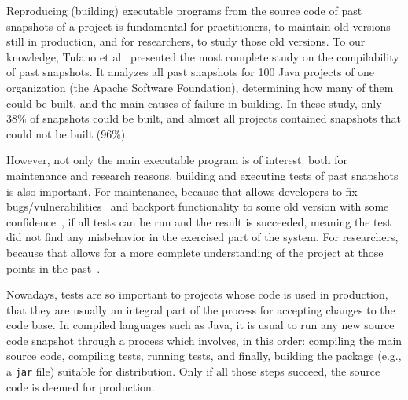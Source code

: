 
Reproducing (building) executable programs from the source code of past snapshots
 of a project is fundamental for practitioners, to maintain old versions still in production, and for researchers, to study those old versions. 
To our knowledge, Tufano et al~\cite{tufano2017there} presented the most complete study on the compilability of past snapshots.
It analyzes all past snapshots for 100 Java projects of one organization (the Apache Software Foundation), determining how many of them could be built, and the main causes of failure in building. 
In these study, only 38\% of snapshots could be built, and almost all projects contained snapshots that could not be built (96\%).

However, not only the main executable program is of interest: both for maintenance and research reasons, building and executing tests of past snapshots is also important. 
For maintenance, because that allows developers to fix bugs/vulnerabilities~\cite{bartelsoftware} and backport functionality to some old version with some confidence~\cite{tian2017mining}, if all tests can be run and the result is succeeded, meaning the test did not find any misbehavior in the exercised part of the system. 
For researchers, because that allows for a more complete understanding of the project at those points in the past~\cite{santos2019mind}.



Nowadays, tests are so important to projects whose code is used in production, that they are usually an integral part of the process for accepting changes to the code base. In compiled languages such as Java, it is usual to run any new source code snapshot through a process which involves, in this order: compiling the main source code, compiling tests, running tests, and finally, building the package (e.g., a \texttt{jar} file) suitable for distribution. 
Only if all those steps succeed, the source code is deemed for production.

